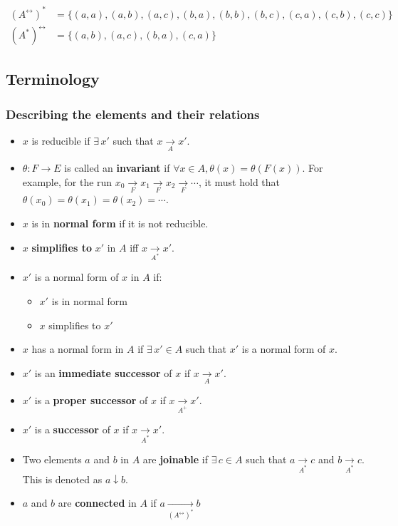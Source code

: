 \begin{align*}
{(A^\leftrightarrow)}^* &= \{(a, a), (a, b), (a, c), (b, a), (b, b), (b, c), (c, a), (c, b), (c, c)\}\\ 
{({A^*})}^\leftrightarrow &= \{(a, b), (a, c), (b, a), (c, a)\}
\end{align*}

\newpage
\subsection{Terminology}

\subsubsection{Describing the elements and their relations}

\begin{itemize}
\item $x$ is reducible if $\exists \, x'$ such that $x \xrightarrow[A]{} x'$.

\item $\theta: F \rightarrow E$ is called an \textbf{invariant} if $\forall x \in A, \theta(x) = \theta(F(x))$. For example, for the run $x_0 \xrightarrow[F]{} x_1 \xrightarrow[F]{} x_2 \xrightarrow[F]{} \cdots$, it must hold that $\theta(x_0) = \theta(x_1) = \theta(x_2) = \cdots$.

\item $x$ is in \textbf{normal form} if it is not reducible.

\item $x$ \textbf{simplifies to} $x'$ in $A$ iff $x \xrightarrow[A^*]{} x'$.

\item $x'$ is a normal form of $x$ in $A$ if: 
\begin{itemize}
\item $x'$ is in normal form
\item $x$ simplifies to $x'$
\end{itemize}

\item $x$ has a normal form in $A$ if $\exists \, x' \in A$ such that $x'$ is a normal form of $x$.

\item $x'$ is an \textbf{immediate successor} of $x$ if $x \xrightarrow[A]{} x'$.

\item $x'$ is a \textbf{proper successor} of $x$ if $x \xrightarrow[A^+]{} x'$.

\item $x'$ is a \textbf{successor} of $x$ if $x \xrightarrow[A^*]{} x'$.

\item Two elements $a$ and $b$ in $A$ are \textbf{joinable} if $\exists \, c \in A$ such that $a \xrightarrow[A^*]{} c$ and $b \xrightarrow[A^*]{} c$. This is denoted as $a \downarrow b$.

\item $a$ and $b$ are \textbf{connected} in $A$ if $a \xrightarrow[{(A^\leftrightarrow)}^*]{} b$

\end{itemize}

